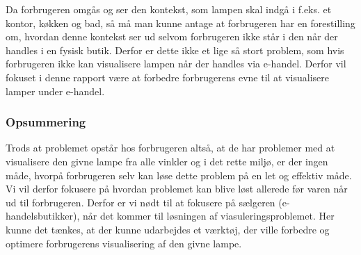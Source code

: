 Da forbrugeren omgås og ser den kontekst, som lampen skal indgå i f.eks. et kontor, køkken og bad, så må man kunne antage at forbrugeren har en forestilling om, hvordan denne kontekst ser ud selvom forbrugeren ikke står i den når der handles i en fysisk butik. Derfor er dette ikke et lige så stort problem, som hvis forbrugeren ikke kan visualisere lampen når der handles via e-handel. Derfor vil fokuset i denne rapport være at forbedre forbrugerens evne til at visualisere lamper under e-handel.

\subsubsection{Opsummering}
Trods at problemet opstår hos forbrugeren altså, at de har problemer med at visualisere den givne lampe fra alle vinkler og i det rette miljø, er der ingen måde, hvorpå forbrugeren selv kan løse dette problem på en let og effektiv måde. Vi vil derfor fokusere på hvordan problemet kan blive løst allerede før varen når ud til forbrugeren. Derfor er vi nødt til at fokusere på sælgeren (e-handelsbutikker), når det kommer til løsningen af viasuleringsproblemet. Her kunne det tænkes, at der kunne udarbejdes et værktøj, der ville forbedre og optimere forbrugerens visualisering af den givne lampe.
